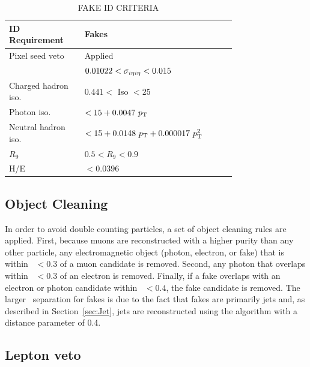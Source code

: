 \begin{table}[ht]
    \caption{FAKE ID CRITERIA}
    \centering
    \begin{tabular}{ |>{\centering\arraybackslash}m{0.25\linewidth}| >{\centering\arraybackslash}m{0.5\linewidth} |}
        \hline
        	\hline
        \textbf{ID Requirement} & \textbf{Fakes} \\ [0.5ex]
        \hline
        	Pixel seed veto    & Applied\\
	\hline
	\sigmaietaieta   & $0.01022 < \sigma_{i\eta i \eta}  < 0.015 $\\
	Charged hadron iso. & $ 0.441 <$ Iso $< 25$\\
	\hline
	Photon iso. &$ < 15 +0.0047~p_{\mathrm{T}}$\\
	Neutral hadron iso. & $< 15 + 0.0148~p_{\mathrm{T}}+0.000017~p_{\mathrm{T}}^2$\\
        $R_9$    & $0.5 < R_9 < 0.9$ \\
        H/E      & $ < 0.0396$\\
           \hline
           \hline
    \end{tabular}
    \label{tab:fakeID}
\end{table}

\subsection{Object Cleaning}
\label{sec:ObjCleaning}

In order to avoid double counting particles, a set of object cleaning rules are applied. 
First, because muons are reconstructed with a higher purity than any other particle, 
any electromagnetic object (photon, electron, or fake) that is within \dR~$< 0.3$ of a muon candidate is removed.
Second, any photon that overlaps within \dR~$< 0.3$ of an electron is removed. Finally, if a fake overlaps with an electron or 
photon candidate within \dR~$< 0.4$, the fake candidate is removed. The larger \dR~separation for fakes is due to the fact
that fakes are primarily jets and, as described in Section~\ref{sec:Jet}, jets are reconstructed using the \antikt algorithm with a distance
parameter of 0.4.  

\subsection{Lepton veto}
\label{sec:lepVeto}

